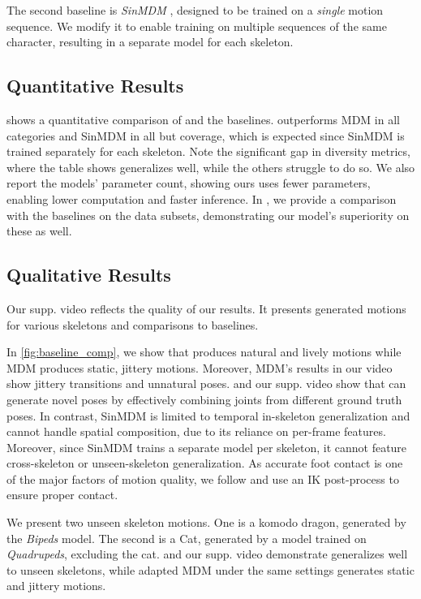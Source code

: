 The second baseline is \emph{SinMDM} \cite{raab2024single}, designed to be trained on a \emph{single} motion sequence. We modify it to enable training on multiple sequences of the same character, resulting in a separate model for each skeleton. 

\ifarxiv


\fi
\subsection{Quantitative Results}


 shows a quantitative comparison of \algoname and the baselines.
\algoname outperforms MDM in all categories and SinMDM in all but coverage, which is expected since SinMDM is trained separately for each skeleton. 
Note the significant gap in diversity metrics, where the table shows \algoname generalizes well, while the others struggle to do so.
We also report the models' parameter count, showing ours uses fewer parameters, enabling lower computation and faster inference.
In , we provide a comparison with the baselines on the data subsets, demonstrating our model's superiority on these as well.

\subsection{Qualitative Results}
Our supp. video reflects the quality of our results. 
It presents generated motions for various skeletons and comparisons to baselines.

\ifarxiv

\fi
In \cref{fig:baseline_comp}, we show that
\algoname produces natural and lively motions while MDM produces static, jittery motions. Moreover, MDM's results 
in our video 
show jittery transitions and unnatural poses.
 and our supp. video show that \algoname can generate novel poses by effectively combining joints from different ground truth poses.
In contrast, SinMDM is limited to temporal in-skeleton generalization and cannot handle spatial composition, due to its reliance on per-frame features.
Moreover, since SinMDM trains a separate model per skeleton, it cannot feature cross-skeleton or unseen-skeleton generalization.
As accurate foot contact is one of the
major factors of motion quality, we follow 
 \citet{li2022ganimator,raab2023modi} and use an IK post-process to ensure proper contact.

We present two unseen skeleton motions. One is a komodo dragon, generated by the \emph{Bipeds} model.
The second is a Cat, generated by a model trained on \emph{Quadrupeds}, excluding the cat.
 and our supp. video demonstrate \algoname generalizes well to unseen skeletons, while adapted MDM under the same settings generates static and jittery motions. 


